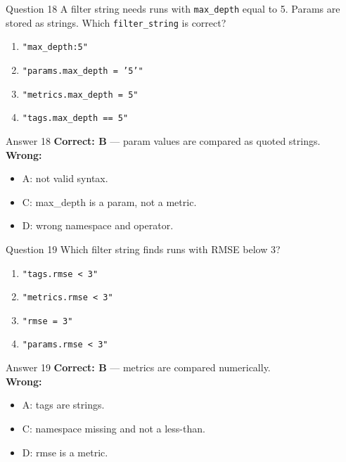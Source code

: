 \documentclass[aspectratio=169,11pt]{beamer}
\begin{document}
\begin{frame}{Question 18}
A filter string needs runs with \texttt{max\_depth} equal to 5. Params are stored as strings. Which \texttt{filter\_string} is correct?
\begin{enumerate}[label=\Alph*.]
\item \texttt{"max\_depth:5"}
\item \texttt{"params.max\_depth = '5'"}
\item \texttt{"metrics.max\_depth = 5"}
\item \texttt{"tags.max\_depth == 5"}
\end{enumerate}
\end{frame}
\begin{frame}{Answer 18}
\textbf{Correct: B} --- param values are compared as quoted strings.\\
\vspace{0.5em}
\textbf{Wrong:}
\begin{itemize}
\item A: not valid syntax.
\item C: max\_depth is a param, not a metric.
\item D: wrong namespace and operator.
\end{itemize}
\end{frame}

\begin{frame}{Question 19}
Which filter string finds runs with RMSE below 3?
\begin{enumerate}[label=\Alph*.]
\item \texttt{"tags.rmse < 3"}
\item \texttt{"metrics.rmse < 3"}
\item \texttt{"rmse = 3"}
\item \texttt{"params.rmse < 3"}
\end{enumerate}
\end{frame}
\begin{frame}{Answer 19}
\textbf{Correct: B} --- metrics are compared numerically.\\
\vspace{0.5em}
\textbf{Wrong:}
\begin{itemize}
\item A: tags are strings.
\item C: namespace missing and not a less-than.
\item D: rmse is a metric.
\end{itemize}
\end{frame}
\end{document}
